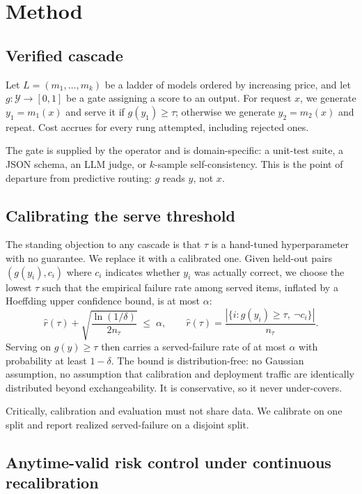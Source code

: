 \documentclass[11pt]{article}
\begin{document}
\section{Method}
\label{sec:method}



\subsection{Verified cascade}

Let $L = (m_1, \dots, m_k)$ be a ladder of models ordered by increasing price, and let
$g : \mathcal{Y} \rightarrow [0,1]$ be a gate assigning a score to an output. For request $x$, we
generate $y_1 = m_1(x)$ and serve it if $g(y_1) \geq \tau$; otherwise we generate $y_2 = m_2(x)$ and
repeat. Cost accrues for every rung attempted, including rejected ones.

The gate is supplied by the operator and is domain-specific: a unit-test suite, a JSON schema, an
LLM judge, or $k$-sample self-consistency. This is the point of departure from predictive routing:
$g$ reads $y$, not $x$.

\subsection{Calibrating the serve threshold}

The standing objection to any cascade is that $\tau$ is a hand-tuned hyperparameter with no
guarantee. We replace it with a calibrated one. Given held-out pairs $(g(y_i), c_i)$ where $c_i$
indicates whether $y_i$ was actually correct, we choose the lowest $\tau$ such that the empirical
failure rate among served items, inflated by a Hoeffding upper confidence bound, is at most
$\alpha$:
\[
\hat{r}(\tau) + \sqrt{\frac{\ln(1/\delta)}{2n_\tau}} \;\leq\; \alpha ,
\qquad
\hat{r}(\tau) = \frac{|\{i : g(y_i) \geq \tau,\ \neg c_i\}|}{n_\tau} .
\]
Serving on $g(y) \geq \tau$ then carries a served-failure rate of at most $\alpha$ with probability
at least $1 - \delta$. The bound is distribution-free: no Gaussian assumption, no assumption that
calibration and deployment traffic are identically distributed beyond exchangeability. It is
conservative, so it never under-covers.

Critically, calibration and evaluation must not share data. We calibrate on one split and report
realized served-failure on a disjoint split.

\subsection{Anytime-valid risk control under continuous recalibration}
\label{sec:anytime}
\end{document}
